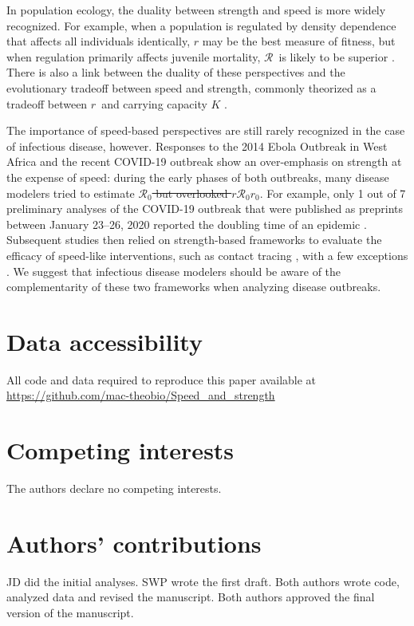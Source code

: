\documentclass[12pt]{article}
\newcommand{\RR}{\ensuremath{{\mathcal R}}}
\newcommand{\Rx}[1]{\ensuremath{\RR_{\mathrm{#1}}}} %
\newcommand{\Ro}{\Rx{0}} %
\newcommand{\rr}{\ensuremath{{r}}}
\newcommand{\rx}[1]{\ensuremath{\rr_{\mathrm{#1}}}} %
\newcommand{\ro}{\rx{0}} %
\providecommand{\DIFaddtex}[1]{{\protect\color{blue}\uwave{#1}}} %
\providecommand{\DIFdeltex}[1]{{\protect\color{red}\sout{#1}}}                      %
\providecommand{\DIFaddbegin}{} %
\providecommand{\DIFaddend}{} %
\providecommand{\DIFdelbegin}{} %
\providecommand{\DIFdelend}{} %
\providecommand{\DIFadd}[1]{\texorpdfstring{\DIFaddtex{#1}}{#1}} %
\providecommand{\DIFdel}[1]{\texorpdfstring{\DIFdeltex{#1}}{}} %
\newcommand{\DIFscaledelfig}{0.5}
\newlength{\DIFdelgraphicswidth} %
\newlength{\DIFdelgraphicsheight} %
\newcommand{\DIFaddincludegraphics}[2][]{{\color{blue}\fbox{\DIFOincludegraphics[#1]{#2}}}} %
\newcommand{\DIFdelincludegraphics}[2][]{%
\sbox{\DIFdelgraphicsbox}{\DIFOincludegraphics[#1]{#2}}%
\settoboxwidth{\DIFdelgraphicswidth}{\DIFdelgraphicsbox} %
\settoboxtotalheight{\DIFdelgraphicsheight}{\DIFdelgraphicsbox} %
\scalebox{\DIFscaledelfig}{%
\parbox[b]{\DIFdelgraphicswidth}{\usebox{\DIFdelgraphicsbox}\\[-\baselineskip] \rule{\DIFdelgraphicswidth}{0em}}\llap{\resizebox{\DIFdelgraphicswidth}{\DIFdelgraphicsheight}{%
\setlength{\unitlength}{\DIFdelgraphicswidth}%
\begin{picture}(1,1)%
\thicklines\linethickness{2pt} %
{\color[rgb]{1,0,0}\put(0,0){\framebox(1,1){}}}%
{\color[rgb]{1,0,0}\put(0,0){\line( 1,1){1}}}%
{\color[rgb]{1,0,0}\put(0,1){\line(1,-1){1}}}%
\end{picture}%
}\hspace*{3pt}}} %
} %
\DeclareRobustCommand{\DIFaddbegin}{\DIFOaddbegin \let\includegraphics\DIFaddincludegraphics} %
\DeclareRobustCommand{\DIFaddend}{\DIFOaddend \let\includegraphics\DIFOincludegraphics} %
\DeclareRobustCommand{\DIFdelbegin}{\DIFOdelbegin \let\includegraphics\DIFdelincludegraphics} %
\DeclareRobustCommand{\DIFdelend}{\DIFOaddend \let\includegraphics\DIFOincludegraphics} %
\begin{document}
In population ecology, the duality between strength and speed is more widely recognized.
For example, when a population is regulated by density dependence that affects all individuals identically, $r$ may be the best measure of fitness, 
but when regulation primarily affects juvenile mortality, \RR\ is likely to be superior \citep{mylius1995evolutionarily,pasztor1996r0}.
There is also a link between the duality of these perspectives and the evolutionary tradeoff between speed and strength, commonly theorized as a tradeoff between \rr\ and carrying capacity $K$ \cite{Pianka70}.

The importance of speed-based perspectives are still rarely recognized in the case of infectious disease, however. 
Responses to the 2014 Ebola Outbreak in West Africa and the recent COVID-19 outbreak show an over-emphasis on strength at the expense of speed:   
during the early phases of both outbreaks, many disease modelers tried to estimate \DIFdelbegin \DIFdel{$\mathcal R_0$ but overlooked $r$}\DIFdelend \DIFaddbegin \Ro\DIFadd{\ but overlooked }\ro\DIFaddend .
For example, only 1 out of 7 preliminary analyses of the COVID-19 outbreak that were published as preprints between January 23--26, 2020 reported the doubling time of an epidemic \citep{bedfordncov, imaincov, liuncov, majumderncov, readncov, riouncov, zhaoncov}.
Subsequent studies then relied on strength-based frameworks to evaluate the efficacy of speed-like interventions, such as contact tracing \cite{hellewell2020feasibility,kretzschmar2020impact,kucharski2020contact}, with a few exceptions \cite{ferretti2020quantifying}.
We suggest that infectious disease modelers should be aware of the complementarity of these two frameworks when analyzing disease outbreaks.



\section*{Data accessibility}

All code and data required to reproduce this paper available at \url{https://github.com/mac-theobio/Speed_and_strength}

\section*{Competing interests}

The authors declare no competing interests.

\section*{Authors’ contributions}

JD did the initial analyses. SWP wrote the first draft. Both authors wrote code, analyzed data and revised the manuscript. Both authors approved the final version of the manuscript.
\end{document}
